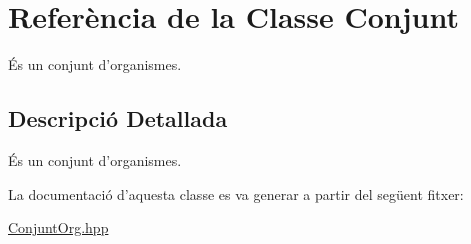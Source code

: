 \hypertarget{class_conjunt}{\section{Referència de la Classe Conjunt}
\label{class_conjunt}
}


És un conjunt d'organismes.  




\subsection{Descripció Detallada}
És un conjunt d'organismes. 

La documentació d'aquesta classe es va generar a partir del següent fitxer\-:\begin{DoxyCompactItemize}
\item 
\hyperlink{_conjunt_org_8hpp}{Conjunt\-Org.\-hpp}\end{DoxyCompactItemize}
